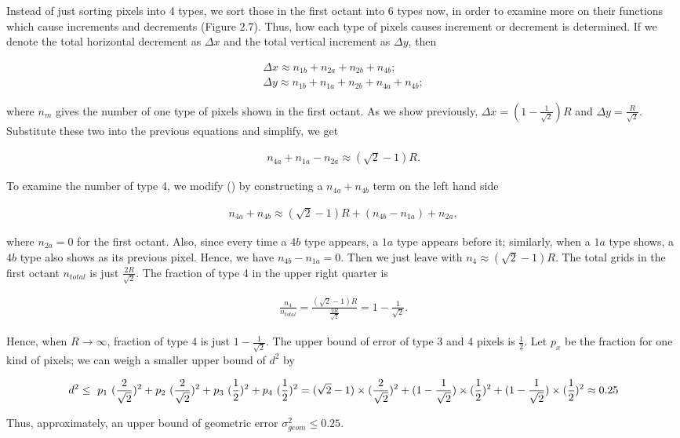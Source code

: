 \documentclass[letterpaper]{article}
\numberwithin{equation}{section} %
\numberwithin{figure}{section} %
\numberwithin{table}{section} %
\begin{document}
Instead of just sorting pixels into 4 types, we sort those in the first octant into 6 types now, in order to examine more on their functions which cause increments and decrements (Figure 2.7). Thus, how each type of pixels causes increment or decrement is determined. If we denote the total horizontal decrement as $\Delta x$ and the total vertical increment as $\Delta y$, then

\begin{align} 
\Delta x \approx n_{1b}+n_{2a}+n_{2b}+n_{4b}; \\
\Delta y \approx n_{1b}+n_{1a}+n_{2b}+n_{4a}+n_{4b};
\end{align}

\noindent
where $n_{m}$ gives the number of one type of pixels shown in the first octant. As we show previously, $\Delta x=(1-\frac{1}{\sqrt{2}})R$ and $\Delta y=\frac{R}{\sqrt{2}}$. Substitute these two into the previous equations and simplify, we get

\begin{align} 
n_{4a}+n_{1a}-n_{2a} \approx (\sqrt{2}-1)R.
\end{align}

\noindent
To examine the number of type 4, we modify () by constructing a $n_{4a}+n_{4b}$ term on the left hand side

\begin{align} 
n_{4a}+n_{4b} \approx (\sqrt{2}-1)R+(n_{4b}-n_{1a})+n_{2a},
\end{align}

\noindent
where $n_{2a}=0$ for the first octant. Also, since every time a $4b$ type appears, a $1a$ type appears before it; similarly, when a $1a$ type shows, a $4b$ type also shows as its previous pixel. Hence, we have $n_{4b}-n_{1a}=0$. Then we just leave with $n_{4} \approx (\sqrt{2}-1)R$. The total grids in the first octant $n_{total}$ is just $\frac{2R}{\sqrt{2}}$. The fraction of type 4 in the upper right quarter is

\begin{align} 
\frac{n_{4}}{n_{total}} = \frac{(\sqrt{2}-1)R}{\frac{2R}{\sqrt{2}}} = 1-\frac{1}{\sqrt{2}}.
\end{align}

\noindent
Hence, when $R \rightarrow \infty$, fraction of type 4 is just $1-\frac{1}{\sqrt{2}}$. The upper bound of error of type 3 and 4 pixels is $\frac{1}{2}$. Let $p_x$ be the fraction for one kind of pixels; we can weigh a smaller upper bound of $d^2$ by 

\begin{equation}
d^2 \leq  \ p_1 \ (\frac{2}{\sqrt{2}})^2 + p_2 \ (\frac{2}{\sqrt{2}})^2 + p_3 \ (\frac{1}{2})^2 + p_4 \ (\frac{1}{2})^2 \\
 = (\sqrt{2}-1) \times (\frac{2}{\sqrt{2}})^2 + (1-\frac{1}{\sqrt{2}}) \times (\frac{1}{2})^2 + (1-\frac{1}{\sqrt{2}}) \times (\frac{1}{2})^2 \\
 \approx 0.25
\end{equation}

\noindent
Thus, approximately, an upper bound of geometric error $\sigma_{geom}^2 \leq 0.25$.
\end{document}
